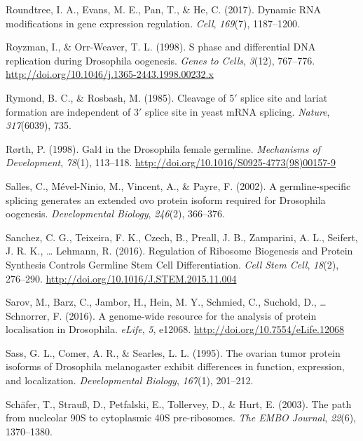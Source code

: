 \documentclass[12pt,oneside]{reedthesis}
\newlength{\cslhangindent}
\newenvironment{cslreferences}%
  {\setlength{\parindent}{0pt}%
  \everypar{\setlength{\hangindent}{\cslhangindent}}\ignorespaces}%
  {\par}
\begin{document}
\begin{cslreferences}
\leavevmode\hypertarget{ref-Roundtree2017}{}%
Roundtree, I. A., Evans, M. E., Pan, T., \& He, C. (2017). Dynamic RNA modifications in gene expression regulation. \emph{Cell}, \emph{169}(7), 1187--1200.

\leavevmode\hypertarget{ref-Royzman1998}{}%
Royzman, I., \& Orr-Weaver, T. L. (1998). S phase and differential DNA replication during Drosophila oogenesis. \emph{Genes to Cells}, \emph{3}(12), 767--776. \url{http://doi.org/10.1046/j.1365-2443.1998.00232.x}

\leavevmode\hypertarget{ref-Rymond1985}{}%
Rymond, B. C., \& Rosbash, M. (1985). Cleavage of 5\({'}\) splice site and lariat formation are independent of 3\({'}\) splice site in yeast mRNA splicing. \emph{Nature}, \emph{317}(6039), 735.

\leavevmode\hypertarget{ref-rorthGal4DrosophilaFemale1998}{}%
Rørth, P. (1998). Gal4 in the Drosophila female germline. \emph{Mechanisms of Development}, \emph{78}(1), 113--118. \url{http://doi.org/10.1016/S0925-4773(98)00157-9}

\leavevmode\hypertarget{ref-Salles2002}{}%
Salles, C., Mével-Ninio, M., Vincent, A., \& Payre, F. (2002). A germline-specific splicing generates an extended ovo protein isoform required for Drosophila oogenesis. \emph{Developmental Biology}, \emph{246}(2), 366--376.

\leavevmode\hypertarget{ref-Sanchez2016h}{}%
Sanchez, C. G., Teixeira, F. K., Czech, B., Preall, J. B., Zamparini, A. L., Seifert, J. R. K., \ldots{} Lehmann, R. (2016). Regulation of Ribosome Biogenesis and Protein Synthesis Controls Germline Stem Cell Differentiation. \emph{Cell Stem Cell}, \emph{18}(2), 276--290. \url{http://doi.org/10.1016/J.STEM.2015.11.004}

\leavevmode\hypertarget{ref-sarovGenomewideResourceAnalysis2016}{}%
Sarov, M., Barz, C., Jambor, H., Hein, M. Y., Schmied, C., Suchold, D., \ldots{} Schnorrer, F. (2016). A genome-wide resource for the analysis of protein localisation in Drosophila. \emph{eLife}, \emph{5}, e12068. \url{http://doi.org/10.7554/eLife.12068}

\leavevmode\hypertarget{ref-Sass1995}{}%
Sass, G. L., Comer, A. R., \& Searles, L. L. (1995). The ovarian tumor protein isoforms of Drosophila melanogaster exhibit differences in function, expression, and localization. \emph{Developmental Biology}, \emph{167}(1), 201--212.

\leavevmode\hypertarget{ref-Schafer2003a}{}%
Schäfer, T., Strauß, D., Petfalski, E., Tollervey, D., \& Hurt, E. (2003). The path from nucleolar 90S to cytoplasmic 40S pre-ribosomes. \emph{The EMBO Journal}, \emph{22}(6), 1370--1380.


\end{cslreferences}
\end{document}
